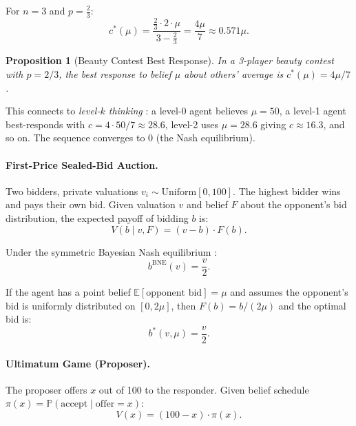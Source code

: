 \documentclass[12pt]{article}
\newtheorem{proposition}{Proposition}
\newcommand{\E}{\mathbb{E}}
\newcommand{\Prob}{\mathbb{P}}
\begin{document}
For $n=3$ and $p = \frac{2}{3}$:
\begin{equation}
    c^*(\mu) = \frac{\frac{2}{3} \cdot 2 \cdot \mu}{3 - \frac{2}{3}} = \frac{4\mu}{7} \approx 0.571\mu.
    \label{eq:bc_br_3player}
\end{equation}

\begin{proposition}[Beauty Contest Best Response]
\label{prop:bc_br}
In a 3-player beauty contest with $p = 2/3$, the best response to belief $\mu$ about others' average is $c^*(\mu) = 4\mu/7$.
\end{proposition}

This connects to \emph{level-$k$ thinking} \citep{nagel1995unraveling, stahl1994experimental}: a level-0 agent believes $\mu = 50$, a level-1 agent best-responds with $c = 4 \cdot 50/7 \approx 28.6$, level-2 uses $\mu = 28.6$ giving $c \approx 16.3$, and so on. The sequence converges to 0 (the Nash equilibrium).

\paragraph{First-Price Sealed-Bid Auction.}
Two bidders, private valuations $v_i \sim \text{Uniform}[0, 100]$. The highest bidder wins and pays their own bid. Given valuation $v$ and belief $F$ about the opponent's bid distribution, the expected payoff of bidding $b$ is:
\begin{equation}
    V(b \mid v, F) = (v - b) \cdot F(b).
    \label{eq:auction_value}
\end{equation}

Under the symmetric Bayesian Nash equilibrium \citep{vickrey1961counterspeculation}:
\begin{equation}
    b^{\text{BNE}}(v) = \frac{v}{2}.
    \label{eq:auction_bne}
\end{equation}

If the agent has a point belief $\E[\text{opponent bid}] = \mu$ and assumes the opponent's bid is uniformly distributed on $[0, 2\mu]$, then $F(b) = b/(2\mu)$ and the optimal bid is:
\begin{equation}
    b^*(v, \mu) = \frac{v}{2}.
    \label{eq:auction_opt}
\end{equation}

\paragraph{Ultimatum Game (Proposer).}
The proposer offers $x$ out of 100 to the responder. Given belief schedule $\pi(x) = \Prob(\text{accept} \mid \text{offer} = x)$:
\begin{equation}
    V(x) = (100 - x) \cdot \pi(x).
    \label{eq:ultimatum_value}
\end{equation}
\end{document}
